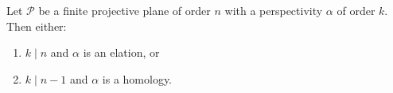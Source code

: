 Let $\mathcal{P}$ be a finite projective plane of order $n$ with a perspectivity $\alpha$ of order $k$. Then either:
\begin{enumerate}
\item[(i)] $k \mid n$ and $\alpha$ is an elation, or
\item[(ii)] $k \mid n-1$ and $\alpha$ is a homology.
\end{enumerate}
